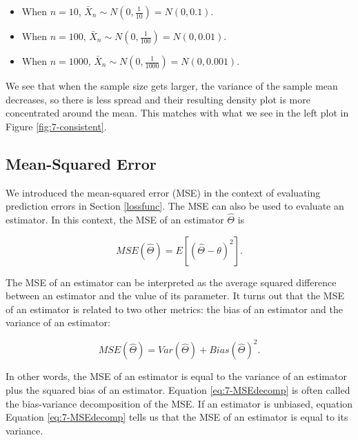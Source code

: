 \documentclass[
]{book}
\providecommand{\tightlist}{%
  \setlength{\itemsep}{0pt}\setlength{\parskip}{0pt}}
\begin{document}
\begin{itemize}
\tightlist
\item
  When \(n=10\), \(\bar{X}_n \sim N(0, \frac{1}{10}) = N(0, 0.1)\).
\item
  When \(n=100\), \(\bar{X}_n \sim N(0, \frac{1}{100}) = N(0,0.01)\).
\item
  When \(n=1000\), \(\bar{X}_n \sim N(0, \frac{1}{1000}) = N(0,0.001)\).
\end{itemize}

We see that when the sample size gets larger, the variance of the sample mean decreases, so there is less spread and their resulting density plot is more concentrated around the mean. This matches with what we see in the left plot in Figure \ref{fig:7-consistent}.

\hypertarget{estMSE}{%
\subsection{Mean-Squared Error}\label{estMSE}}

We introduced the mean-squared error (MSE) in the context of evaluating prediction errors in Section \ref{lossfunc}. The MSE can also be used to evaluate an estimator. In this context, the MSE of an estimator \(\hat{\Theta}\) is

\begin{equation} 
MSE(\hat{\Theta}) = E\left[(\hat{\Theta} - \theta)^2 \right].
\label{eq:7-MSE}
\end{equation}

The MSE of an estimator can be interpreted as the average squared difference between an estimator and the value of its parameter. It turns out that the MSE of an estimator is related to two other metrics: the bias of an estimator and the variance of an estimator:

\begin{equation} 
MSE(\hat{\Theta}) = Var(\hat{\Theta}) + Bias(\hat{\Theta})^2.
\label{eq:7-MSEdecomp}
\end{equation}

In other words, the MSE of an estimator is equal to the variance of an estimator plus the squared bias of an estimator. Equation \eqref{eq:7-MSEdecomp} is often called the bias-variance decomposition of the MSE. If an estimator is unbiased, equation Equation \eqref{eq:7-MSEdecomp} tells us that the MSE of an estimator is equal to its variance.
\end{document}
